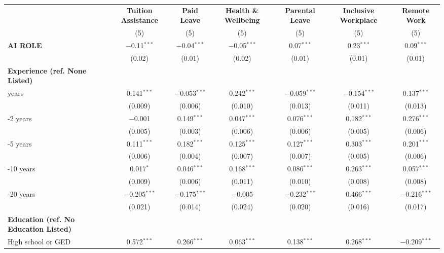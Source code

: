 \begin{table}[!htbp]
\centering
\tiny
\begin{tabular}{lcccccc}
\toprule
 & \multicolumn{1}{c}{\textbf{Tuition Assistance}} & \multicolumn{1}{c}{\textbf{Paid Leave}} & \multicolumn{1}{c}{\textbf{Health \& Wellbeing}} & \multicolumn{1}{c}{\textbf{Parental Leave}} & \multicolumn{1}{c}{\textbf{Inclusive Workplace}} & \multicolumn{1}{c}{\textbf{Remote Work}} \\
\cmidrule(lr){2-2} \cmidrule(lr){3-3} \cmidrule(lr){4-4} \cmidrule(lr){5-5} \cmidrule(lr){6-6} \cmidrule(lr){7-7}
 & (5) & (5) & (5) & (5) & (5) & (5) \\
\midrule
\textbf{AI ROLE} & $-$0.11$^{***}$ & $-$0.04$^{***}$ & $-$0.05$^{***}$ & 0.07$^{***}$ & 0.23$^{***}$ & 0.09$^{***}$ \\
 & (0.02) & (0.01) & (0.02) & (0.01) & (0.01) & (0.01) \\
\textbf{Experience (ref. None Listed)} &  &  &  &  &  &  \\
\quad 0 years & 0.141$^{***}$ & $-$0.053$^{***}$ & 0.242$^{***}$ & $-$0.059$^{***}$ & $-$0.154$^{***}$ & 0.137$^{***}$ \\
 & (0.009) & (0.006) & (0.010) & (0.013) & (0.011) & (0.013) \\
\quad 1-2 years & $-$0.001 & 0.149$^{***}$ & 0.047$^{***}$ & 0.076$^{***}$ & 0.182$^{***}$ & 0.276$^{***}$ \\
 & (0.005) & (0.003) & (0.006) & (0.006) & (0.005) & (0.006) \\
\quad 3-5 years & 0.111$^{***}$ & 0.182$^{***}$ & 0.125$^{***}$ & 0.127$^{***}$ & 0.303$^{***}$ & 0.201$^{***}$ \\
 & (0.006) & (0.004) & (0.007) & (0.007) & (0.005) & (0.006) \\
\quad 6-10 years & 0.017$^{*}$ & 0.046$^{***}$ & 0.168$^{***}$ & 0.086$^{***}$ & 0.263$^{***}$ & 0.057$^{***}$ \\
 & (0.009) & (0.006) & (0.011) & (0.010) & (0.008) & (0.008) \\
\quad 11-20 years & $-$0.205$^{***}$ & $-$0.175$^{***}$ & $-$0.005 & $-$0.232$^{***}$ & 0.466$^{***}$ & $-$0.216$^{***}$ \\
 & (0.021) & (0.014) & (0.024) & (0.020) & (0.016) & (0.017) \\
\textbf{Education (ref. No Education Listed)} &  &  &  &  &  &  \\
\quad High school or GED & 0.572$^{***}$ & 0.266$^{***}$ & 0.063$^{***}$ & 0.138$^{***}$ & 0.268$^{***}$ & $-$0.209$^{***}$ \\

\end{tabular}
\end{table}
